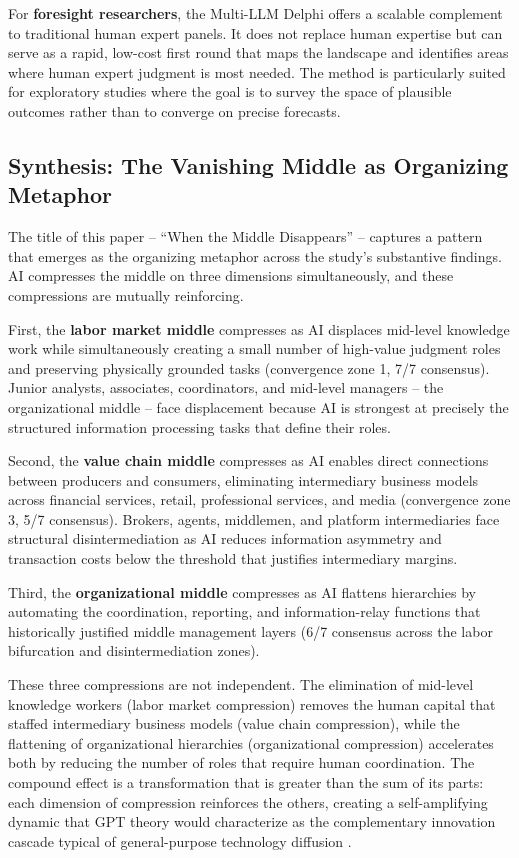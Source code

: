 \documentclass[preprint,review,12pt]{elsarticle}
\begin{document}
For \textbf{foresight researchers}, the Multi-LLM Delphi offers a scalable complement to traditional human expert panels. It does not replace human expertise but can serve as a rapid, low-cost first round that maps the landscape and identifies areas where human expert judgment is most needed. The method is particularly suited for exploratory studies where the goal is to survey the space of plausible outcomes rather than to converge on precise forecasts.


\subsection{Synthesis: The Vanishing Middle as Organizing Metaphor}
\label{sec:vanishing_middle}

The title of this paper -- ``When the Middle Disappears'' -- captures a pattern that emerges as the organizing metaphor across the study's substantive findings. AI compresses the middle on three dimensions simultaneously, and these compressions are mutually reinforcing.

First, the \textbf{labor market middle} compresses as AI displaces mid-level knowledge work while simultaneously creating a small number of high-value judgment roles and preserving physically grounded tasks (convergence zone 1, 7/7 consensus). Junior analysts, associates, coordinators, and mid-level managers -- the organizational middle -- face displacement because AI is strongest at precisely the structured information processing tasks that define their roles.

Second, the \textbf{value chain middle} compresses as AI enables direct connections between producers and consumers, eliminating intermediary business models across financial services, retail, professional services, and media (convergence zone 3, 5/7 consensus). Brokers, agents, middlemen, and platform intermediaries face structural disintermediation as AI reduces information asymmetry and transaction costs below the threshold that justifies intermediary margins.

Third, the \textbf{organizational middle} compresses as AI flattens hierarchies by automating the coordination, reporting, and information-relay functions that historically justified middle management layers (6/7 consensus across the labor bifurcation and disintermediation zones).

These three compressions are not independent. The elimination of mid-level knowledge workers (labor market compression) removes the human capital that staffed intermediary business models (value chain compression), while the flattening of organizational hierarchies (organizational compression) accelerates both by reducing the number of roles that require human coordination. The compound effect is a transformation that is greater than the sum of its parts: each dimension of compression reinforces the others, creating a self-amplifying dynamic that GPT theory would characterize as the complementary innovation cascade typical of general-purpose technology diffusion \citep{bresnahan1995gpt, helpman1998gpt}.
\end{document}
